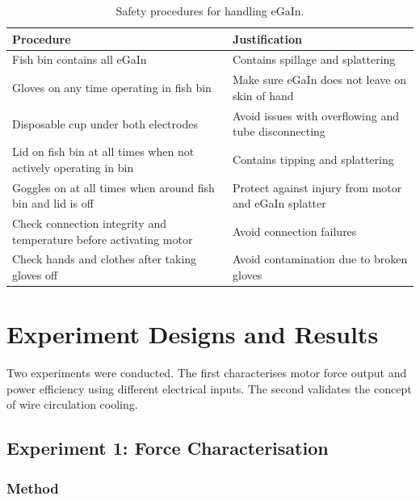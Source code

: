 \documentclass[a4paper,12pt]{article}
\begin{document}
\begin{table} [h!]
    \centering
    \caption{Safety procedures for handling eGaIn.}
    \label{tb:safety}
    \begin{tabular}{L | L}
        \hline
        \textbf{Procedure} & \textbf{Justification} \\ [0.5ex]
        \hline\hline
        Fish bin contains all eGaIn & Contains spillage and splattering \\
        \hline
        Gloves on any time operating in fish bin & Make sure eGaIn does not leave on skin of hand\\
        \hline
        Disposable cup under both electrodes & Avoid issues with overflowing and tube disconnecting \\
        \hline
        Lid on fish bin at all times when not actively operating in bin & Contains tipping and splattering \\
        \hline
        Goggles on at all times when around fish bin and lid is off & Protect against injury from motor and eGaIn splatter \\
        \hline
        Check connection integrity and temperature before activating motor & Avoid connection failures \\
        \hline
        Check hands and clothes after taking gloves off & Avoid contamination due to broken gloves \\
        \hline
    \end{tabular}
\end{table}

\newpage

\section{Experiment Designs and Results}
Two experiments were conducted. The first characterises motor force output and power efficiency using different electrical inputs. The second validates the concept of wire circulation cooling.

\subsection{Experiment 1: Force Characterisation}

\subsubsection{Method}
\end{document}
